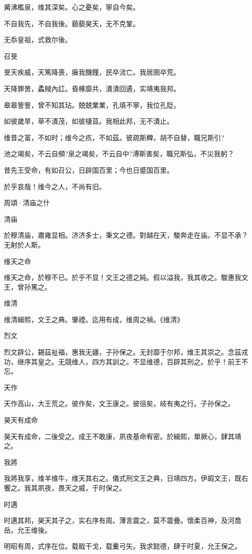 觱沸檻泉，维其深矣。心之憂矣，寧自今矣。

不自我先，不自我後。藐藐昊天，无不克鞏。

无忝皇祖，式救尔後。

召旻

旻天疾威，天篤降喪，瘨我饑饉，民卒流亡。我居圉卒荒。

天降罪罟，蟊賊內訌。昏椓靡共，潰潰回遹，实靖夷我邦。

皋皋訾訾，曾不知其玷。兢兢業業，孔填不寧，我位孔貶。

如彼歲旱，草不潰茂，如彼棲苴。我相此邦，无不潰止。

维昔之富，不如时；维今之疚，不如茲。彼疏斯粺，胡不自替，職兄斯引?

池之竭矣，不云自頻?泉之竭矣，不云自中?溥斯害矣，職兄斯弘，不災我躬？

昔先王受命，有如召公，日辟国百里；今也日蹙国百里。

於乎哀哉！维今之人，不尚有旧。




周頌·清庙之什

清庙

於穆清庙，肅雍显相。济济多士，秉文之德。對越在天，駿奔走在庙。不显不承？无射於人斯。

维天之命

维天之命，於穆不已。於乎不显！文王之德之純。假以溢我，我其收之。駿惠我文王，曾孙篤之。

维清

维清緝熙，文王之典。肇禋。迄用有成，维周之禎。《维清》

烈文

烈文辟公，錫茲祉福，惠我无疆，子孙保之。无封靡于尔邦，维王其崇之。念茲戎功，继序其皇之。无競维人，四方其訓之。不显维德，百辟其刑之。於乎！前王不忘。

天作

天作高山，大王荒之。彼作矣，文王康之。彼徂矣，岐有夷之行。子孙保之。

昊天有成命

昊天有成命，二後受之。成王不敢康，夙夜基命宥密。於緝熙，單厥心，肆其靖之。

我將

我將我享，维羊维牛，维天其右之。儀式刑文王之典，日靖四方。伊嘏文王，既右饗之。我其夙夜，畏天之威，于时保之。

时邁

时邁其邦，昊天其子之，实右序有周。薄言震之，莫不震疊。懷柔百神，及河喬岳。允王维後。

明昭有周，式序在位。载戢干戈，载櫜弓矢。我求懿德，肆于时夏，允王保之。

